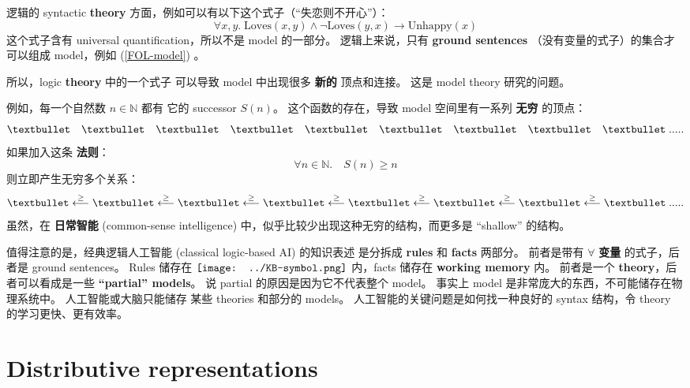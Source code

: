 \documentclass[12pt, orivec]{article}
\newcommand*\KB{\vcenter{\hbox{\texttt{[image: ../KB-symbol.png]}}}}
\begin{document}
逻辑的 syntactic \textbf{theory} 方面，例如可以有以下这个式子（``失恋则不开心''）：
\begin{equation}
\forall x,y. \; \mbox{Loves}(x,y) \wedge \neg \mbox{Loves}(y,x) \rightarrow \mbox{Unhappy}(x)
\end{equation}
这个式子含有 universal quantification，所以不是 model 的一部分。 逻辑上来说，只有 \textbf{ground sentences} （没有变量的式子）的集合才可以组成 model，例如 (\ref{FOL-model}) 。 

所以，logic \textbf{theory} 中的一个式子 可以导致 model 中出现很多 \textbf{新的} 顶点和连接。 这是 model theory 研究的问题。

例如，每一个自然数 $n \in \mathbb{N}$ 都有 它的 successor $S(n)$。 这个函数的存在，导致 model 空间里有一系列 \textbf{无穷} 的顶点：
\begin{equation}
\textbullet \quad \textbullet \quad \textbullet \quad \textbullet \quad \textbullet \quad \textbullet \quad \textbullet \quad \textbullet \quad \textbullet \; .....
\end{equation}
如果加入这条 \textbf{法则}：
\begin{equation}
\forall n \in \mathbb{N}. \quad S(n) \ge n
\end{equation}
则立即产生无穷多个关系：
\begin{equation}
\textbullet \stackrel{\ge}{\longleftarrow} \textbullet \stackrel{\ge}{\longleftarrow} \textbullet \stackrel{\ge}{\longleftarrow} \textbullet \stackrel{\ge}{\longleftarrow} \textbullet \stackrel{\ge}{\longleftarrow} \textbullet \stackrel{\ge}{\longleftarrow} \textbullet \stackrel{\ge}{\longleftarrow} \textbullet \; .....
\end{equation}
虽然，在 \textbf{日常智能} (common-sense intelligence) 中，似乎比较少出现这种无穷的结构，而更多是 ``shallow'' 的结构。 

值得注意的是，经典逻辑人工智能 (classical logic-based AI) 的知识表述 是分拆成 \textbf{rules} 和 \textbf{facts} 两部分。 前者是带有 $\forall$ \textbf{变量} 的式子，后者是 ground sentences。  Rules 储存在 $\KB$ 内，facts 储存在 \textbf{working memory} 内。 前者是一个 \textbf{theory}，后者可以看成是一些 \textbf{``partial'' models}。  说 partial 的原因是因为它不代表整个 model。  事实上 model 是非常庞大的东西，不可能储存在物理系统中。  人工智能或大脑只能储存 某些 theories 和部分的 models。  人工智能的关键问题是如何找一种良好的 syntax 结构，令 theory 的学习更快、更有效率。 

\section{Distributive representations}
\end{document}
